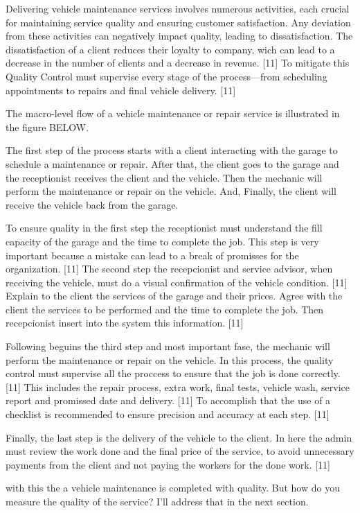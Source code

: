 Delivering vehicle maintenance services involves numerous activities, each crucial for maintaining service quality and ensuring customer satisfaction. 
Any deviation from these activities can negatively impact quality, leading to dissatisfaction. 
The dissatisfaction of a client reduces their loyalty to company, wich can lead to a decrease in the number of clients and a decrease in revenue. [11]
To mitigate this Quality Control must supervise every stage of the process—from scheduling appointments to repairs and final vehicle delivery. [11]

The macro-level flow of a vehicle maintenance or repair service is illustrated in the figure BELOW. 

The first step of the process starts with a client interacting with the garage to schedule a maintenance or repair. 
After that, the client goes to the garage and the receptionist receives the client and the vehicle.
Then the mechanic will perform the maintenance or repair on the vehicle.
And, Finally, the client will receive the vehicle back from the garage.

To ensure quality in the first step the receptionist must understand the fill capacity of the garage and the time to complete the job. 
This step is very important because a mistake can lead to a break of promisses for the organization. [11]
The second step the recepcionist and service advisor, when receiving the vehicle, must do a visual confirmation of the vehicle condition. [11]
Explain to the client the services of the garage and their prices. Agree with the client the services to be performed and the time to complete the job. 
Then recepcionist insert into the system this information. [11]

Following beguins the third step and most important fase, the mechanic will perform the maintenance or repair on the vehicle. 
In this process, the quality control must supervise all the proccess to ensure that the job is done correctly. [11]
This includes the repair process, extra work, final tests, vehicle wash, service report and promissed date and delivery. [11]
To accomplish that the use of a checklist is recommended to ensure precision and accuracy at each step. [11]

Finally, the last step is the delivery of the vehicle to the client. 
In here  the admin must review the work done and the final price of the service, to avoid unnecessary payments from the client and not paying the workers for the done work. [11]

with this the a vehicle maintenance is completed with quality. 
But how do you measure the quality of the service?
I'll address that in the next section.

